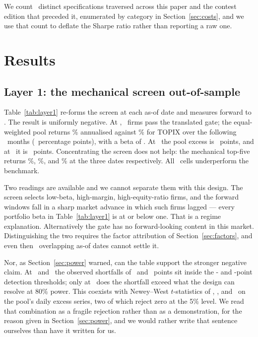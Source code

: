 \documentclass[a4paper,11pt]{article}
\begin{document}
We count \SpecTotal\ distinct specifications traversed across this paper and the contest edition
that preceded it, enumerated by category in Section~\ref{sec:costs}, and we use that count to
deflate the Sharpe ratio \citep{BaileyLopezdePrado2014} rather than reporting a raw one.

\section{Results}\label{sec:results}

\subsection{Layer 1: the mechanical screen out-of-sample}

Table~\ref{tab:layer1} re-forms the screen at each as-of date and measures forward to \LoneEnd.
The result is uniformly negative. At \LoneADate, \LoneAGate\ firms pass the translated gate; the
equal-weighted pool returns \LoneAPoolAnn\% annualised against \LoneATopix\% for TOPIX over the
following \LoneAMonths\ months (\LoneAPoolExcess\ percentage points), with a beta of
\LoneAPoolBeta. At \LoneBDate\ the pool excess is \LoneBPoolExcess\ points, and at \LoneCDate\ it is
\LoneCPoolExcess\ points. Concentrating the screen does not help: the mechanical top-five returns
\LoneATopFiveAnn\%, \LoneBTopFiveAnn\%, and \LoneCTopFiveAnn\% at the three dates respectively.
All \LoneCells\ cells underperform the benchmark.

Two readings are available and we cannot separate them with this design. The screen selects
low-beta, high-margin, high-equity-ratio firms, and the forward windows fall in a sharp market
advance in which such firms lagged --- every portfolio beta in Table~\ref{tab:layer1} is at or below
one. That is a regime explanation. Alternatively the gate has no forward-looking content in this
market. Distinguishing the two requires the factor attribution of Section~\ref{sec:factors}, and
even then \LoneNasof\ overlapping as-of dates cannot settle it.

Nor, as Section~\ref{sec:power} warned, can the table support the stronger negative claim. At
\LoneADate\ and \LoneBDate\ the observed shortfalls of \LoneAPoolExcess\ and \LoneBPoolExcess\ points
sit inside the \MdeA- and \MdeB-point detection thresholds; only at \LoneCDate\ does the shortfall
exceed what the design can resolve at 80\% power. This coexists with Newey--West $t$-statistics of
\LoneAPoolT, \LoneBPoolT, and \LoneCPoolT\ on the pool's daily excess series, two of which reject zero
at the 5\% level. We read that combination as a fragile rejection rather than as a demonstration, for
the reason given in Section~\ref{sec:power}, and we would rather write that sentence ourselves than
have it written for us.
\end{document}
